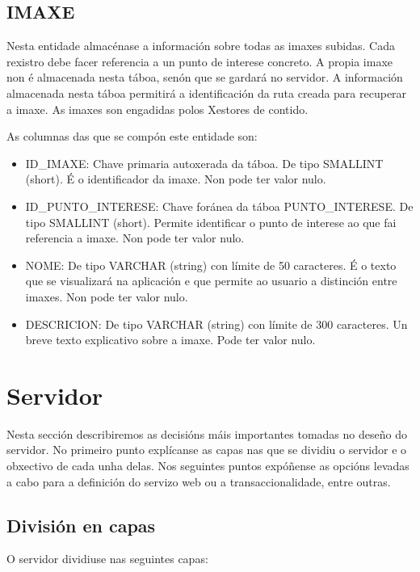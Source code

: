 \subsection{IMAXE}
Nesta entidade almacénase a información sobre todas as imaxes subidas. Cada rexistro debe facer referencia a un punto de interese concreto. A propia imaxe non é almacenada nesta táboa, senón que se gardará no servidor. A información almacenada nesta táboa permitirá a identificación da ruta creada para recuperar a imaxe. As imaxes son engadidas polos Xestores de contido.

As columnas das que se compón este entidade son:
\begin{itemize}
	\item ID\_IMAXE: Chave primaria autoxerada da táboa. De tipo SMALLINT (short). É o identificador da imaxe. Non pode ter valor nulo.
	\item ID\_PUNTO\_INTERESE: Chave foránea da táboa PUNTO\_INTERESE. De tipo SMALLINT (short). Permite identificar o punto de interese ao que fai referencia a imaxe. Non pode ter valor nulo.
	\item NOME: De tipo VARCHAR (string) con límite de 50 caracteres. É o texto que se visualizará na aplicación e que permite ao usuario a distinción entre imaxes. Non pode ter valor nulo.
	\item DESCRICION: De tipo VARCHAR (string) con límite de 300 caracteres. Un breve texto explicativo sobre a imaxe. Pode ter valor nulo.
\end{itemize}


\section{Servidor}
Nesta sección describiremos as decisións máis importantes tomadas no deseño do servidor. No primeiro punto explícanse as capas nas que se dividiu o servidor e o obxectivo de cada unha delas. Nos seguintes puntos expóñense as opcións levadas a cabo para a definición do servizo web ou a transaccionalidade, entre outras.

\subsection{División en capas}
O servidor dividiuse nas seguintes capas:

